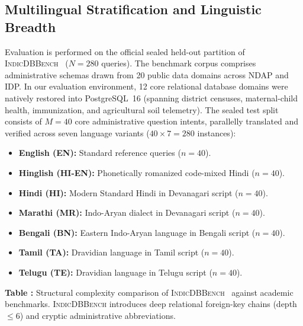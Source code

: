 \documentclass[conference]{IEEEtran}
\begin{document}
\subsection{Multilingual Stratification and Linguistic Breadth}
Evaluation is performed on the official sealed held-out partition of \textsc{IndicDBBench}~\cite{dawar2026indicdbbench} ($N = 280$ queries). The benchmark corpus comprises administrative schemas drawn from 20 public data domains across NDAP and IDP. In our evaluation environment, 12 core relational database domains were natively restored into PostgreSQL~16 (spanning district censuses, maternal-child health, immunization, and agricultural soil telemetry). The sealed test split consists of $M = 40$ core administrative question intents, parallelly translated and verified across seven language variants ($40 \times 7 = 280$ instances):
\begin{itemize}
    \item \textbf{English (EN):} Standard reference queries ($n=40$).
    \item \textbf{Hinglish (HI-EN):} Phonetically romanized code-mixed Hindi ($n=40$).
    \item \textbf{Hindi (HI):} Modern Standard Hindi in Devanagari script ($n=40$).
    \item \textbf{Marathi (MR):} Indo-Aryan dialect in Devanagari script ($n=40$).
    \item \textbf{Bengali (BN):} Eastern Indo-Aryan language in Bengali script ($n=40$).
    \item \textbf{Tamil (TA):} Dravidian language in Tamil script ($n=40$).
    \item \textbf{Telugu (TE):} Dravidian language in Telugu script ($n=40$).
\end{itemize}

\begin{table}[htbp]
\centering
\renewcommand{\arraystretch}{1.25}
\vspace{6pt}
\label{tab:benchmark_comparison}
\begin{flushleft}
\small\textbf{Table \thetable:} Structural complexity comparison of \textsc{IndicDBBench}~\cite{dawar2026indicdbbench} against academic benchmarks. \textsc{IndicDBBench} introduces deep relational foreign-key chains (depth $\le 6$) and cryptic administrative abbreviations.
\end{flushleft}
\end{table}
\end{document}
